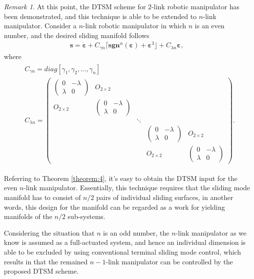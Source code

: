 \documentclass[3p]{elsarticle}
\theoremstyle{plain}
\theoremstyle{remark}
\newtheorem{myrem}{Remark}
\begin{document}
\begin{myrem}
At this point, the DTSM scheme for $2$-link robotic manipulator has been demonstrated, and this technique is able to be extended to $n$-link manipulator. Consider a $n$-link robotic manipulator in which $n$ is an even number, and the desired sliding manifold follows 
\begin{align}
\bm s = \dot{\bm \varepsilon}+C_{\gamma n}\lceil\bm{sgn}^\alpha(\bm \varepsilon)+\bm\varepsilon^3\rfloor+C_{\lambda n}{\bm\varepsilon},
\end{align}
where
\begin{align}
\begin{split}
&C_{\gamma n}=diag[\gamma_1,\gamma_2,\ldots,\gamma_n]\\
&C_{\lambda n}=
\begin{pmatrix}
\begin{pmatrix}
0 &-\lambda\\ \lambda &0
\end{pmatrix} &O_{2\times 2} & & &\\
O_{2\times 2} &\begin{pmatrix}
0 &-\lambda\\ \lambda &0
\end{pmatrix} & & &\\
& &\ddots & &\\
& & &\begin{pmatrix}
0 &-\lambda\\ \lambda &0
\end{pmatrix} &O_{2\times 2}\\
& & &O_{2\times 2} &\begin{pmatrix}
0 &-\lambda\\ \lambda &0
\end{pmatrix}
\end{pmatrix}.
\end{split}
\end{align}\par
Referring to Theorem \ref{theorem:4}, it's easy to obtain the DTSM input for the even $n$-link manipulator. Essentially, this technique requires that the sliding mode manifold has to consist of $n/2$ pairs of individual sliding surfaces, in another words, this design for the manifold can be regarded as a work for yielding manifolds of the $n/2$ sub-systems.\par
Considering the situation that $n$ is an odd number, the $n$-link manipulator as we know is assumed as a full-actuated system, and hence an individual dimension is able to be excluded by using conventional terminal sliding mode control, which results in that the remained $n-1$-link manipulator can be controlled by the proposed DTSM scheme.
\end{myrem}
\end{document}

